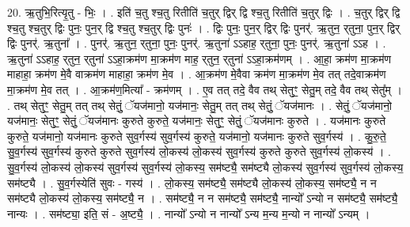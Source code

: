 \documentclass[17pt]{extarticle}
\begin{document}
20. ऋ॒तुभि॒रित्यृ॒तु - भिः॒ । . इति॑ च॒तु श्च॒तु रितीति॑ च॒तुर् द्विर् द्वि श्च॒तु रितीति॑ च॒तुर् द्विः । . च॒तुर् द्विर् द्वि श्च॒तु श्च॒तुर् द्विः पुनः॒ पुन॒र् द्वि श्च॒तु श्च॒तुर् द्विः पुनः॑ । . द्विः पुनः॒ पुन॒र् द्विर् द्विः पुनर्॑. ऋ॒तुन॒ र्‌तुना॒ पुन॒र् द्विर् द्विः पुनर्॑. ऋ॒तुना᳚ । . पुनर्॑. ऋ॒तुन॒ र्‌तुना॒ पुनः॒ पुनर्॑. ऋ॒तुना॑ ऽऽहाह॒ र्‌तुना॒ पुनः॒ पुनर्॑. ऋ॒तुना॑ ऽऽह । . ऋ॒तुना॑ ऽऽहाह॒ र्‌तुन॒ र्‌तुना॑ ऽऽहा॒क्रम॑ण मा॒क्रम॑ण माह॒ र्‌तुन॒ र्‌तुना॑ ऽऽहा॒क्रम॑णम् । . आ॒हा॒ क्रम॑ण मा॒क्रम॑ण माहाहा॒ क्रम॑ण मे॒वै वाक्रम॑ण माहाहा॒ क्रम॑ण मे॒व । . आ॒क्रम॑ण मे॒वैवा क्रम॑ण मा॒क्रम॑ण मे॒व तत् तदे॒वाक्रम॑ण मा॒क्रम॑ण मे॒व तत् । . आ॒क्रम॑ण॒मित्या᳚ - क्रम॑णम् । . ए॒व तत् तदे॒ वैव तथ् सेतुꣳ॒॒ सेतु॒म् तदे॒ वैव तथ् सेतु᳚म् । . तथ् सेतुꣳ॒॒ सेतु॒म् तत् तथ् सेतुं॒ ॅयज॑मानो॒ यज॑मानः॒ सेतु॒म् तत् तथ् सेतुं॒ ॅयज॑मानः । . सेतुं॒ ॅयज॑मानो॒ यज॑मानः॒ सेतुꣳ॒॒ सेतुं॒ ॅयज॑मानः कुरुते कुरुते॒ यज॑मानः॒ सेतुꣳ॒॒ सेतुं॒ ॅयज॑मानः कुरुते । . यज॑मानः कुरुते कुरुते॒ यज॑मानो॒ यज॑मानः कुरुते सुव॒र्गस्य॑ सुव॒र्गस्य॑ कुरुते॒ यज॑मानो॒ यज॑मानः कुरुते सुव॒र्गस्य॑ । . कु॒रु॒ते॒ सु॒व॒र्गस्य॑ सुव॒र्गस्य॑ कुरुते कुरुते सुव॒र्गस्य॑ लो॒कस्य॑ लो॒कस्य॑ सुव॒र्गस्य॑ कुरुते कुरुते सुव॒र्गस्य॑ लो॒कस्य॑ । . सु॒व॒र्गस्य॑ लो॒कस्य॑ लो॒कस्य॑ सुव॒र्गस्य॑ सुव॒र्गस्य॑ लो॒कस्य॒ सम॑ष्ट्यै॒ सम॑ष्ट्यै लो॒कस्य॑ सुव॒र्गस्य॑ सुव॒र्गस्य॑ लो॒कस्य॒ सम॑ष्ट्यै । . सु॒व॒र्गस्येति॑ सुवः - गस्य॑ । . लो॒कस्य॒ सम॑ष्ट्यै॒ सम॑ष्ट्यै लो॒कस्य॑ लो॒कस्य॒ सम॑ष्ट्यै॒ न न सम॑ष्ट्यै लो॒कस्य॑ लो॒कस्य॒ सम॑ष्ट्यै॒ न । . सम॑ष्ट्यै॒ न न सम॑ष्ट्यै॒ सम॑ष्ट्यै॒ नान्यो᳚ ऽन्यो न सम॑ष्ट्यै॒ सम॑ष्ट्यै॒ नान्यः । . सम॑ष्ट्या॒ इति॒ सं - अ॒ष्ट्यै॒ । . नान्यो᳚ ऽन्यो न नान्यो᳚ ऽन्य म॒न्य म॒न्यो न नान्यो᳚ ऽन्यम् । \newline
\end{document}
